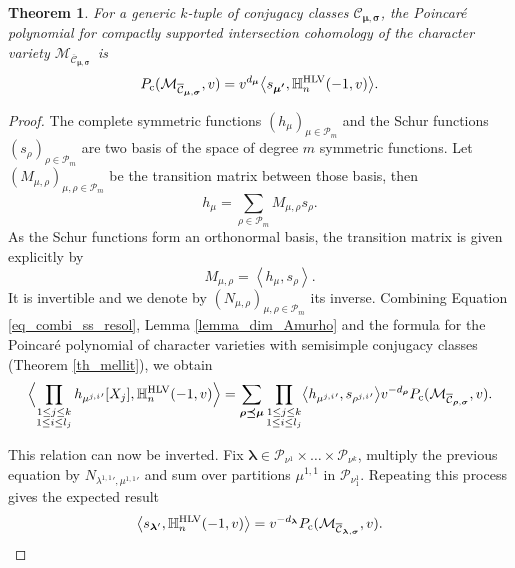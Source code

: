 \documentclass[JEP,XML,SOM,NoEqCountersInSection,Unicode,published]{cedram}
\newcommand{\rc}{\mathrm{c}}
\newcommand{\HLV}{\textup{HLV}}
\newcommand{\blangle}{\bigl\langle}
\newcommand{\brangle}{\bigr\rangle}
\theoremstyle{definition}
\theoremstyle{plain}
\newtheorem{theorem}[definition]{Theorem}
\newcommand{\Part}{\mathcal{P}}
\begin{document}
\begin{theorem}\label{th_sect_poincare}
For a generic $k$-tuple of conjugacy classes ${\mathcal{C}}_{\boldsymbol{\mu},\boldsymbol{\sigma}}$, the Poincaré polynomial for compactly supported intersection cohomology of the character variety $\mathcal{M}_{\overline{\mathcal{C}}_{\boldsymbol{\mu},\boldsymbol{\sigma}}}$~is
\[
P_{\rc}(\mathcal{M}_{\overline{\mathcal{C}}_{\boldsymbol{\mu},\boldsymbol{\sigma}}},v) = v^{d_{\boldsymbol{\mu}}}\blangle s_{\boldsymbol{\mu'}}, \mathbb{H}_n^{\HLV}(-1,v)\brangle.
\]
\end{theorem}
\begin{proof}
The complete symmetric functions $(h_{\mu})_{\mu\in \Part_m}\!$ and the Schur functions $(s_{\rho})_{\rho\in\Part_m}\!$ are two basis of the space of degree $m$ symmetric functions. Let $(M_{\mu,\rho})_{\mu,\rho\in\Part_m }$ be the transition matrix between those basis, then
\[
h_{\mu} = \sum_{\rho \in\Part_m} M_{\mu,\rho} s_{\rho}.
\]
As the Schur functions form an orthonormal basis, the transition matrix is given explicitly by
\[
M_{\mu,\rho} = \left\langle h_{\mu},s_{\rho}\right\rangle.
\]
It is invertible and we denote by $(N_{\mu,\rho})_{\mu,\rho \in \Part_m }$ its inverse. Combining Equation \eqref{eq_combi_ss_resol}, Lemma \ref{lemma_dim_Amurho} and the formula for the Poincaré polynomial of character varieties with semisimple conjugacy classes (Theorem \ref{th_mellit}), we obtain
\[
\Bigl\langle \prod_{\substack{1 \le j \le k \\ 1 \le i \le l_j}} h_{ {\mu^{j,i}}'}[X_j],\mathbb{H}_n^{\HLV}(-1,v)\Bigr\rangle = \sum_{\boldsymbol{\rho\preceq\mu}} \prod_{\substack{1 \le j \le k \\ 1 \le i \le l_j}}\blangle h_{ {\mu^{ j,i}}' }, s_{ {\rho^{ j,i}}' }\brangle v^{-d_{\boldsymbol{\rho}}} P_{\rc}(\mathcal{M}_{\overline{\mathcal{C}}_{\boldsymbol{\rho},\boldsymbol{\sigma}}}, v).
\]

This relation can now be inverted. Fix $\boldsymbol{\lambda}\in \Part_{\nu^1}\times\dots\times\Part_{\nu^k}$, multiply the previous equation by $N_{{\lambda^{1,1}}',{\mu^{1,1}}'}$ and sum over partitions ${\mu^{1,1}}$ in $ \Part_{\nu^1_1}$. Repeating this process gives the expected result
\[
\left\langle s_{\boldsymbol{\lambda}'}, \mathbb{H}_n^{\HLV}(-1,v)\right\rangle = v^{-d_{\boldsymbol{\lambda}}} P_{\rc}(\mathcal{M}_{\overline{\mathcal{C}}_{\boldsymbol{\lambda},\boldsymbol{\sigma}}}, v).
\]


\end{proof}
\end{document}
